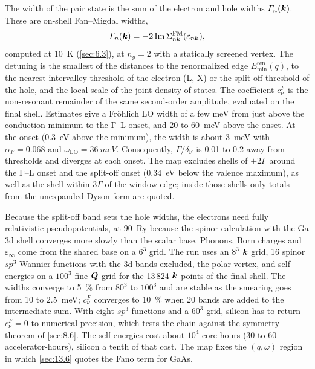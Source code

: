 The width of the pair state is the sum of the electron and hole widths $\varGamma_n(\bm{k})$. These are on-shell Fan--Migdal widths,
\begin{equation*}
  \varGamma_n(\bm{k}) = -2\operatorname{Im}\Sigma^{\mathrm{FM}}_{n\bm{k}}(\varepsilon_{n\bm{k}}) ,
\end{equation*}
computed at \SI{10}{K} (\cref{sec:6.3}), at $n_g = 2$ with a statically screened vertex. The detuning is the smallest of the distances to the renormalized edge $E_{\min}^{\mathrm{ren}}(q)$, to the nearest intervalley threshold of the electron (L, X) or the split-off threshold of the hole, and the local scale of the joint density of states. The coefficient $c^F_\nu$ is the non-resonant remainder of the same second-order amplitude, evaluated on the final shell. Estimates give a Fr\"ohlich LO width of a few meV from just above the conduction minimum to the $\mathrm{\Gamma}$--L onset, and 20 to \SI{60}{meV} above the onset. At the onset (\SI{0.3}{eV} above the minimum), the width is about \SI{3}{meV} with $\alpha_F = 0.068$ and $\omega_{\mathrm{LO}} = \SI{36}{meV}$. Consequently, $\varGamma/\delta_{\mathrm{F}}$ is 0.01 to 0.2 away from thresholds and diverges at each onset. The map excludes shells of $\pm2\varGamma$ around the $\mathrm{\Gamma}$--L onset and the split-off onset (\SI{0.34}{eV} below the valence maximum), as well as the shell within $3\varGamma$ of the window edge; inside those shells only totals from the unexpanded Dyson form are quoted.

Because the split-off band sets the hole widths, the electrons need fully relativistic pseudopotentials, at \SI{90}{Ry} because the spinor calculation with the Ga 3d shell converges more slowly than the scalar base. Phonons, Born charges and $\varepsilon_\infty$ come from the shared base on a $6^3$ grid. The run uses an $8^3$ $\bm{k}$ grid, 16 spinor $sp^3$ Wannier functions with the 3d bands excluded, the polar vertex, and self-energies on a $100^3$ fine $\bm{Q}$ grid for the 13\,824 $\bm{k}$ points of the final shell. The widths converge to \SI{5}{\percent} from $80^3$ to $100^3$ and are stable as the smearing goes from 10 to \SI{2.5}{meV}; $c^F_\nu$ converges to \SI{10}{\percent} when 20 bands are added to the intermediate sum. With eight $sp^3$ functions and a $60^3$ grid, silicon has to return $c^F_\nu = 0$ to numerical precision, which tests the chain against the symmetry theorem of \cref{sec:8.6}. The self-energies cost about $10^4$ core-hours (30 to 60 accelerator-hours), silicon a tenth of that cost. The map fixes the $(q,\omega)$ region in which \cref{sec:13.6} quotes the Fano term for GaAs.

